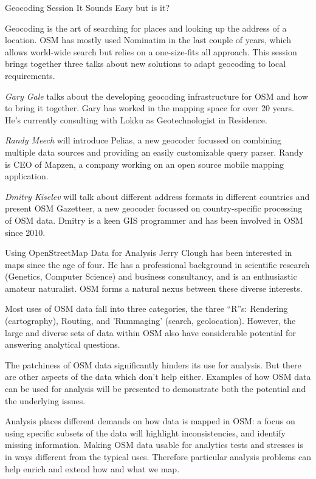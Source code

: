 %
{Geocoding Session}%
{It Sounds Easy but is it?}%
{}%
{Geocoding is the art of searching for places and looking up
the address of a location.
OSM has mostly used Nominatim in the last couple of years, which
allows world-wide search but relies on a one-size-fits all approach.
This session brings together three talks about new solutions to
adapt geocoding to local requirements.

\textit{Gary Gale} talks about the developing geocoding infrastructure for
OSM and how to bring it together. Gary has worked in the mapping
space for over 20 years. He's currently consulting with Lokku as
Geotechnologist in Residence.

\textit{Randy Meech} will introduce Pelias, a new geocoder focussed
on combining multiple data sources and providing an easily customizable
query parser. Randy is CEO of Mapzen, a company working on an open source
mobile mapping application.

\textit{Dmitry Kiselev} will talk about different address formats in different
countries and present OSM Gazetteer, a new geocoder focussed on
country-specific processing of OSM data. Dmitry is a keen GIS programmer
and has been involved in OSM since 2010.
}

%
{Using OpenStreetMap Data for Analysis}%
{Jerry Clough has been interested in maps since the age of four. He has a professional background in scientific research (Genetics, Computer Science) and business consultancy, and is an enthusiastic amateur naturalist. OSM forms a natural nexus between these diverse interests. }%
{Most uses of OSM data fall into three categories, the three ``R''s: Rendering (cartography), Routing, and 'Rummaging' (search, geolocation). However, the large and diverse sets of data within OSM also have considerable potential for answering analytical questions.

The patchiness of OSM data significantly hinders its use for analysis.  But there are other aspects of the data which don't help either. Examples of how OSM data can be used for analysis will be presented to demonstrate both the potential and the underlying issues.

Analysis places different demands on how data is mapped in OSM: a focus on using specific subsets of the data will highlight inconsistencies, and identify missing information. Making OSM data usable for analytics tests and stresses is in ways different from the typical uses. Therefore particular analysis problems can help enrich and extend how and what we map.}
